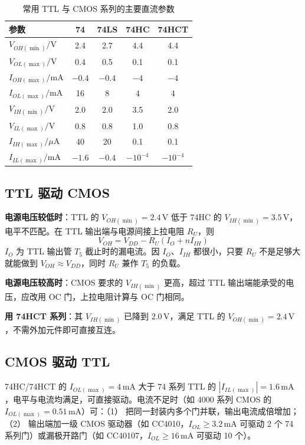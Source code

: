 \begin{table}[!htbp]
    \centering
    \caption{常用 TTL 与 CMOS 系列的主要直流参数}
    \begin{tabular}{lcccc}
        \toprule
        参数 & 74 & 74LS & 74HC & 74HCT \\
        \midrule
        \(V_{OH(\min)}/\mathrm{V}\) & 2.4 & 2.7 & 4.4 & 4.4 \\
        \(V_{OL(\max)}/\mathrm{V}\) & 0.4 & 0.5 & 0.1 & 0.1 \\
        \(I_{OH(\max)}/\mathrm{mA}\) & \(-0.4\) & \(-0.4\) & \(-4\) & \(-4\) \\
        \(I_{OL(\max)}/\mathrm{mA}\) & 16 & 8 & 4 & 4 \\
        \(V_{IH(\min)}/\mathrm{V}\) & 2.0 & 2.0 & 3.5 & 2.0 \\
        \(V_{IL(\max)}/\mathrm{V}\) & 0.8 & 0.8 & 1.0 & 0.8 \\
        \(I_{IH(\max)}/\mu\mathrm{A}\) & 40 & 20 & 0.1 & 0.1 \\
        \(I_{IL(\max)}/\mathrm{mA}\) & \(-1.6\) & \(-0.4\) & \(-10^{-4}\) & \(-10^{-4}\) \\
        \bottomrule
    \end{tabular}
\end{table}

\subsection{TTL 驱动 CMOS}
\textbf{电源电压较低时}：TTL 的 \(V_{OH(\min)}=2.4\,\mathrm{V}\) 低于 74HC 的 \(V_{IH(\min)}=3.5\,\mathrm{V}\)，电平不匹配。在 TTL 输出端与电源间接上拉电阻 \(R_U\)，则
\[
V_{OH}=V_{DD}-R_U\left(I_O+nI_{IH}\right)
\]
\(I_O\) 为 TTL 输出管 \(T_5\) 截止时的漏电流。因 \(I_O\)、\(I_{IH}\) 都很小，只要 \(R_U\) 不是足够大就能做到 \(V_{OH}\approx V_{DD}\)，同时 \(R_U\) 兼作 \(T_5\) 的负载。

\textbf{电源电压较高时}：CMOS 要求的 \(V_{IH(\min)}\) 更高，超过 TTL 输出端能承受的电压，应改用 OC 门，上拉电阻计算与 OC 门相同。

\textbf{用 74HCT 系列}：其 \(V_{IH(\min)}\) 已降到 \(2.0\,\mathrm{V}\)，满足 TTL 的 \(V_{OH(\min)}=2.4\,\mathrm{V}\)，不需外加元件即可直接互连。

\subsection{CMOS 驱动 TTL}
74HC/74HCT 的 \(I_{OL(\max)}=4\,\mathrm{mA}\) 大于 74 系列 TTL 的 \(|I_{IL(\max)}|=1.6\,\mathrm{mA}\)，电平与电流均满足，可直接驱动。电流不足时（如 4000 系列 CMOS 的 \(I_{OL(\max)}=0.51\,\mathrm{mA}\)）可：（1） 把同一封装内多个门并联，输出电流成倍增加；（2） 输出端加一级 CMOS 驱动器（如 CC4010，\(I_{OL}\ge3.2\,\mathrm{mA}\) 可驱动 2 个 74 系列门）或漏极开路门（如 CC40107，\(I_{OL}\ge16\,\mathrm{mA}\) 可驱动 10 个）。

